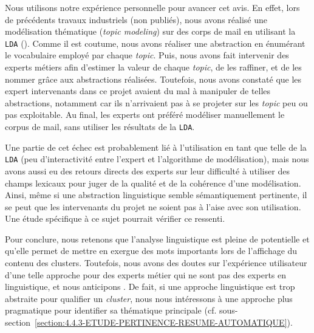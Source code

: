 			\begin{leftBarAuthorOpinion}
				Nous utilisons notre expérience personnelle pour avancer cet avis.
				En effet, lors de précédents travaux industriels (non publiés), nous avons réalisé une modélisation thématique (\textit{topic modeling}) sur des corps de mail en utilisant la \texttt{LDA} (\cite{blei-etal:2003:latent-dirichlet-allocation}).
				Comme il est coutume, nous avons réaliser une abstraction en énumérant le vocabulaire employé par chaque \textit{topic}.
				Puis, nous avons fait intervenir des experts métiers afin d'estimer la valeur de chaque \textit{topic}, de les raffiner, et de les nommer grâce aux abstractions réalisées.
				Toutefois, nous avons constaté que les expert intervenants dans ce projet avaient du mal à manipuler de telles abstractions, notamment car ils n'arrivaient pas à se projeter sur les \textit{topic} peu ou pas exploitable.
				Au final, les experts ont préféré modéliser manuellement le corpus de mail, sans utiliser les résultats de la \texttt{LDA}.
				
				Une partie de cet échec est probablement lié à l'utilisation en tant que telle de la \texttt{LDA} (peu d'interactivité entre l'expert et l'algorithme de modélisation), mais nous avons aussi eu des retours directs des experts sur leur difficulté à utiliser des champs lexicaux pour juger de la qualité et de la cohérence d'une modélisation.
				Ainsi, même si une abstraction linguistique semble sémantiquement pertinente, il se peut que les intervenants du projet ne soient pas à l'aise avec son utilisation.
				Une étude spécifique à ce sujet pourrait vérifier ce ressenti.
			\end{leftBarAuthorOpinion}
			
			Pour conclure, nous retenons que l'analyse linguistique est pleine de potentielle et qu'elle permet de mettre en exergue des mots importants lors de l'affichage du contenu des clusters. Toutefois, nous avons des doutes sur l'expérience utilisateur d'une telle approche pour des experts métier qui ne sont pas des experts en linguistique, et nous anticipons .
			De fait, si une approche linguistique est trop abstraite pour qualifier un \textit{cluster}, nous nous intéressons à une approche plus pragmatique pour identifier sa thématique principale (cf. sous-section~\ref{section:4.4.3-ETUDE-PERTINENCE-RESUME-AUTOMATIQUE}).
	
	
